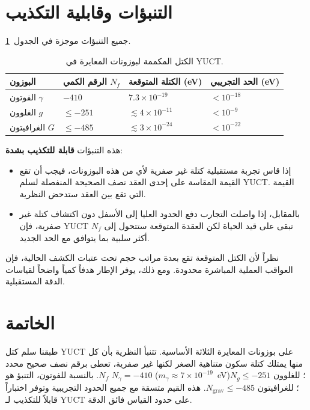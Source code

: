 \documentclass[12pt,a4paper]{article}
\begin{document}
	\clearpage
	\section{التنبؤات وقابلية التكذيب}
	
	جميع التنبؤات موجزة في الجدول~\ref{tab:predictions}.
	
	\begin{table}[H]
		\centering
		\footnotesize
		\caption{الكتل المكممة لبوزونات المعايرة في YUCT.}
		\label{tab:predictions}
		\begin{tabular}{p{3cm}p{3cm}p{3cm}p{3cm}}
			\toprule
			\textbf{البوزون} & \textbf{الرقم الكمي \(N_f\)} & \textbf{الكتلة المتوقعة (eV)} & \textbf{الحد التجريبي (eV)} \\
			\midrule
			الفوتون   $\gamma$ & $-410$ & $7.3 \times 10^{-19}$ & $< 10^{-18}$ \\
			الغلوون    $g$      & $\le -251$ & $\lesssim 4 \times 10^{-11}$ & $< 10^{-9}$ \\
			الغرافيتون $G$      & $\le -485$ & $\lesssim 3 \times 10^{-24}$ & $< 10^{-22}$ \\
			\bottomrule
		\end{tabular}
	\end{table}
	
	هذه التنبؤات \textbf{قابلة للتكذيب بشدة}:
	\begin{itemize}
		\item إذا قاس تجربة مستقبلية كتلة غير صفرية لأي من هذه البوزونات، فيجب أن تقع القيمة المقاسة على إحدى العقد نصف الصحيحة المنفصلة لسلم YUCT. القيمة التي تقع بين العقد ستدحض النظرية.
		\item بالمقابل، إذا واصلت التجارب دفع الحدود العليا إلى الأسفل دون اكتشاف كتلة غير صفرية، فإن YUCT تبقى على قيد الحياة لكن العقدة المتوقعة ستتحول إلى \(N_f\) أكثر سلبية بما يتوافق مع الحد الجديد.
	\end{itemize}
	
	نظراً لأن الكتل المتوقعة تقع بعدة مراتب حجم تحت عتبات الكشف الحالية، فإن العواقب العملية المباشرة محدودة. ومع ذلك، يوفر الإطار هدفاً كمياً واضحاً لقياسات الدقة المستقبلية.
	
	\section{الخاتمة}
	
	طبقنا سلم كتل YUCT على بوزونات المعايرة الثلاثة الأساسية. تتنبأ النظرية بأن كل منها يمتلك كتلة سكون متناهية الصغر لكنها غير صفرية، تعطى برقم نصف صحيح محدد \(N_f\). بالنسبة للفوتون، التنبؤ هو \(N_\gamma = -410\) (\(m_\gamma \approx 7\times 10^{-19}\)~eV)؛ للغلوون \(N_g \le -251\)؛ للغرافيتون \(N_{\mathrm{grav}} \le -485\). هذه القيم متسقة مع جميع الحدود التجريبية وتوفر اختباراً قابلاً للتكذيب لـ YUCT على حدود القياس فائق الدقة.
	
\end{document}
